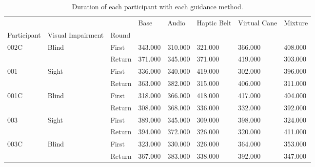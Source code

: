 
\begin{table}[!htb]
\centering
\caption{Duration of each participant with each guidance method.}
\label{tab:duration}
\begin{tabular}{llllllll}
\toprule
     &       &        &    Base &   Audio & Haptic Belt & Virtual Cane & Mixture \\
Participant & Visual Impairment & Round &         &         &             &              &         \\
\midrule
002C & Blind & First & 343.000 & 310.000 &     321.000 &      366.000 & 408.000 \\
     &       & Return & 371.000 & 345.000 &     371.000 &      419.000 & 303.000 \\
001 & Sight & First & 336.000 & 340.000 &     419.000 &      302.000 & 396.000 \\
     &       & Return & 363.000 & 382.000 &     315.000 &      406.000 & 311.000 \\
001C & Blind & First & 318.000 & 366.000 &     418.000 &      417.000 & 404.000 \\
     &       & Return & 308.000 & 368.000 &     336.000 &      332.000 & 392.000 \\
003 & Sight & First & 389.000 & 345.000 &     309.000 &      398.000 & 324.000 \\
     &       & Return & 394.000 & 372.000 &     326.000 &      320.000 & 411.000 \\
003C & Blind & First & 323.000 & 330.000 &     326.000 &      364.000 & 353.000 \\
     &       & Return & 367.000 & 383.000 &     338.000 &      392.000 & 347.000 \\
\bottomrule
\end{tabular}
\end{table}

